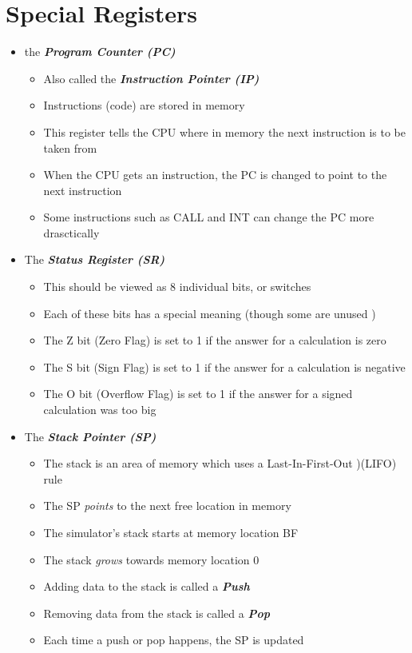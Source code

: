 \documentclass{article}
\begin{document}
  \section{Special Registers}
  \begin{itemize}
    \item{the \textbf{\textit{Program Counter (PC)}}}
    \begin{itemize}
      \item{Also called the \textbf{\textit{Instruction Pointer (IP)}}}
      \item{Instructions (code) are stored in memory}
      \item{This register tells the CPU where in memory the next instruction is to be taken from}
      \item{When the CPU gets an instruction, the PC is changed to point to the next instruction}
      \item{Some instructions such as CALL and INT can change the PC more drasctically}
    \end{itemize}
    \item{The \textbf{\textit{Status Register (SR)}}}
    \begin{itemize}
      \item{This should be viewed as 8 individual bits, or switches}
      \item{Each of these bits has a special meaning (though some are unused )}
      \item{The Z bit (Zero Flag) is set to 1 if the answer for a calculation is zero}
      \item{The S bit (Sign Flag) is set to 1 if the answer for a calculation is negative}
      \item{The O bit (Overflow Flag) is set to 1 if the answer for a signed calculation was too big}
    \end{itemize}
    \pagebreak
    \item{The \textbf{\textit{Stack Pointer (SP)}}}
    \begin{itemize}
      \item{The stack is an area of memory which uses a Last-In-First-Out )(LIFO) rule}
      \item{The SP \textit{points} to the next free location in memory}
      \item{The simulator's stack starts at memory location BF}
      \item{The stack \textit{grows} towards memory location 0}
      \item{Adding data to the stack is called a \textbf{\textit{Push}}}
      \item{Removing data from the stack is called a \textbf{\textit{Pop}}}
      \item{Each time a push or pop happens, the SP is updated}
    \end{itemize}
  \end{itemize}
\end{document}
